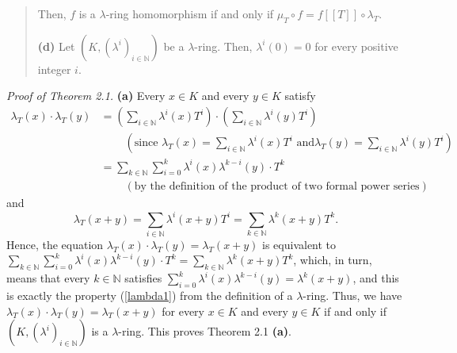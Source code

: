 \documentclass[numbers=enddot,12pt,final,onecolumn,notitlepage]{scrartcl}%
\begin{document}
\begin{quote}
Then, $f$ is a $\lambda$-ring homomorphism if and only if $\mu_{T}\circ
f=f\left[  \left[  T\right]  \right]  \circ\lambda_{T}$.

\textbf{(d)} Let $\left(  K,\left(  \lambda^{i}\right)  _{i\in\mathbb{N}%
}\right)  $ be a $\lambda$-ring. Then, $\lambda^{i}\left(  0\right)  =0$ for
every positive integer $i$.
\end{quote}

\textit{Proof of Theorem 2.1.} \textbf{(a)} Every $x\in K$ and every $y\in K$
satisfy%
\begin{align*}
\lambda_{T}\left(  x\right)  \cdot\lambda_{T}\left(  y\right)   &  =\left(
\sum\limits_{i\in\mathbb{N}}\lambda^{i}\left(  x\right)  T^{i}\right)
\cdot\left(  \sum\limits_{i\in\mathbb{N}}\lambda^{i}\left(  y\right)
T^{i}\right) \\
&  \ \ \ \ \ \ \ \ \ \ \left(  \text{since }\lambda_{T}\left(  x\right)
=\sum\limits_{i\in\mathbb{N}}\lambda^{i}\left(  x\right)  T^{i}\text{ and
}\lambda_{T}\left(  y\right)  =\sum\limits_{i\in\mathbb{N}}\lambda^{i}\left(
y\right)  T^{i}\right) \\
&  =\sum_{k\in\mathbb{N}}\sum_{i=0}^{k}\lambda^{i}\left(  x\right)
\lambda^{k-i}\left(  y\right)  \cdot T^{k}\\
&  \ \ \ \ \ \ \ \ \ \ \left(  \text{by the definition of the product of two
formal power series}\right)
\end{align*}
and%
\[
\lambda_{T}\left(  x+y\right)  =\sum_{i\in\mathbb{N}}\lambda^{i}\left(
x+y\right)  T^{i}=\sum_{k\in\mathbb{N}}\lambda^{k}\left(  x+y\right)  T^{k}.
\]
Hence, the equation $\lambda_{T}\left(  x\right)  \cdot\lambda_{T}\left(
y\right)  =\lambda_{T}\left(  x+y\right)  $ is equivalent to $\sum
\limits_{k\in\mathbb{N}}\sum\limits_{i=0}^{k}\lambda^{i}\left(  x\right)
\lambda^{k-i}\left(  y\right)  \cdot T^{k}=\sum\limits_{k\in\mathbb{N}}%
\lambda^{k}\left(  x+y\right)  T^{k}$, which, in turn, means that every
$k\in\mathbb{N}$ satisfies $\sum\limits_{i=0}^{k}\lambda^{i}\left(  x\right)
\lambda^{k-i}\left(  y\right)  =\lambda^{k}\left(  x+y\right)  $, and this is
exactly the property (\ref{lambda1}) from the definition of a $\lambda$-ring.
Thus, we have $\lambda_{T}\left(  x\right)  \cdot\lambda_{T}\left(  y\right)
=\lambda_{T}\left(  x+y\right)  $ for every $x\in K$ and every $y\in K$ if and
only if $\left(  K,\left(  \lambda^{i}\right)  _{i\in\mathbb{N}}\right)  $ is
a $\lambda$-ring. This proves Theorem 2.1 \textbf{(a)}.
\end{document}
